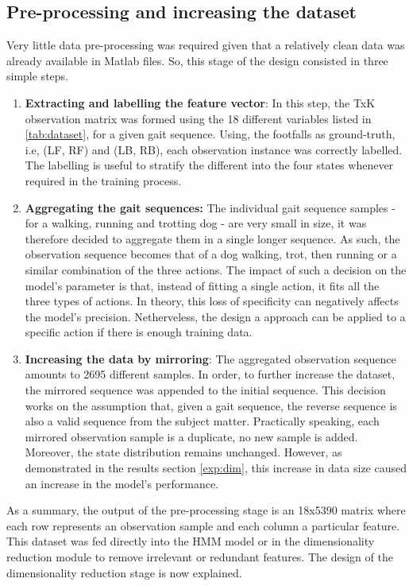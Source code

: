 \subsection{Pre-processing and increasing the dataset}
Very little data pre-processing was required given that a relatively clean data was already available in Matlab files.
So, this stage of the design consisted in three simple steps.
\begin{enumerate}
	\item \textbf{Extracting and labelling the feature vector}: In this step, the TxK observation matrix was formed using the 18 different variables listed in \ref{tab:dataset}, for a given gait sequence. Using, the footfalls as ground-truth, i.e, (LF, RF) and (LB, RB), each observation instance was correctly labelled. The labelling is useful to stratify the different into the four states whenever required in the training process.
	
	\item \textbf{Aggregating the gait sequences:} The individual gait sequence samples - for a walking, running and trotting dog - are very small in size, it was therefore decided to aggregate them in a single longer sequence. As such, the observation sequence becomes that of a dog walking, trot, then running or a similar combination of the three actions. The impact of such a decision on the model's parameter is that, instead of fitting a single action, it fits all the three types of actions. In theory, this loss of specificity can negatively affects the model's precision. Netherveless, the design a approach can be applied to a specific action if there is enough training data.
	
	\item \textbf{Increasing the data by mirroring}: The aggregated observation sequence amounts to 2695 different samples. In order, to further increase the dataset, the mirrored sequence was appended to the initial sequence. This decision works on the assumption that, given a gait sequence, the reverse sequence is also a valid sequence from the subject matter. %
	Practically speaking, each mirrored observation sample is a duplicate, no new sample is added. Moreover, the state distribution remains unchanged. However, as demonstrated in the results section \ref{exp:dim}, this increase in data size caused an increase in the model's performance.
\end{enumerate}

As a summary, the output of the pre-processing stage is an 18x5390 matrix where each row represents an observation sample and each column a particular feature.
This dataset was fed directly into the HMM model or in the dimensionality reduction module to remove irrelevant or redundant features.
The design of the dimensionality reduction stage is now explained.


